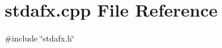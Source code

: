 \section{stdafx.\+cpp File Reference}
\label{stdafx_8cpp}
{\ttfamily \#include \char`\"{}stdafx.\+h\char`\"{}}\newline
